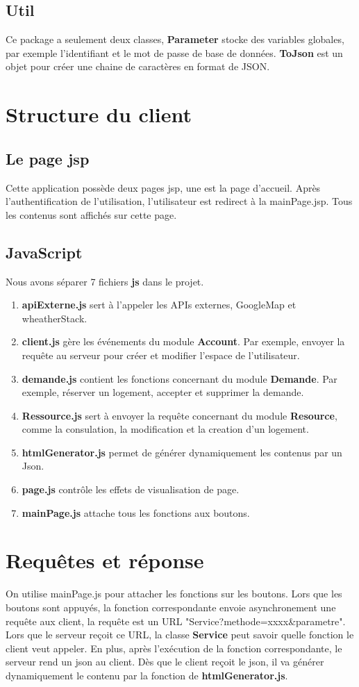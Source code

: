 \documentclass[14px]{article}
\begin{document}
\subsection{Util}
Ce package a seulement deux classes, \textbf{Parameter} stocke des variables globales, par exemple l'identifiant et le mot de passe de base de données. \textbf{ToJson} est un objet pour créer une chaine de caractères en format de JSON.

\section{Structure du client}
\subsection{Le page jsp}
Cette application possède deux pages jsp, une est la page d'accueil. Après l'authentification de l'utilisation, l'utilisateur est redirect à la mainPage.jsp. Tous les contenus sont affichés sur cette page.
\subsection{JavaScript}
Nous avons séparer 7 fichiers \textbf{js} dans le projet.  
\begin{enumerate}
	\item \textbf{apiExterne.js} sert à l'appeler les APIs externes, GoogleMap et wheatherStack.
	\item \textbf{client.js} gère les événements du module \textbf{Account}. Par exemple, envoyer la requête au serveur pour créer et modifier l'espace de l'utilisateur.
	\item \textbf{demande.js} contient les fonctions concernant du module \textbf{Demande}. Par exemple, réserver un logement, accepter et supprimer la demande.
	\item \textbf{Ressource.js} sert à envoyer la requête concernant du module \textbf{Resource}, comme la consulation, la modification et la creation d'un logement.
	\item \textbf{htmlGenerator.js} permet de générer dynamiquement les contenus par un Json.
	\item \textbf{page.js} contrôle les effets de visualisation de page.
	\item \textbf{mainPage.js} attache tous les fonctions aux boutons.
\end{enumerate}



\section{Requêtes et réponse}
On utilise mainPage.js pour attacher les fonctions sur les boutons. Lors que les boutons sont appuyés, la fonction correspondante envoie asynchronement une requête aux client, la requête est un URL "Service?methode=xxxx\&parametre". Lors que le serveur reçoit ce URL, la classe \textbf{Service} peut savoir quelle fonction le client veut appeler. En plus, après l'exécution de la fonction correspondante, le serveur rend un json au client. Dès que le client reçoit le json, il va générer dynamiquement le contenu par la fonction de \textbf{htmlGenerator.js}.
\end{document}
